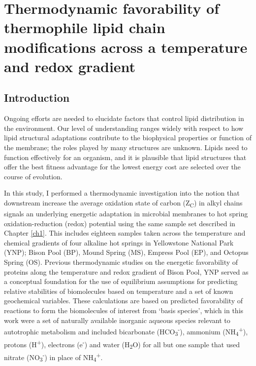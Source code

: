 \chapter[THERMODYNAMIC FAVORABILITY OF THERMOPHILE LIPID CHAIN MODIFICATIONS ACROSS A TEMPERATURE AND REDOX GRADIENT]{Thermodynamic favorability of thermophile lipid chain modifications across a temperature and redox gradient}\label{ch2}

\section{Introduction}

Ongoing efforts are needed to elucidate factors that control lipid distribution in the environment. Our level of understanding ranges widely with respect to how lipid structural adaptations contribute to the biophysical properties or function of the membrane; the roles played by many structures are unknown. Lipids need to function effectively for an organism, and it is plausible that lipid structures that offer the best fitness advantage for the lowest energy cost are selected over the course of evolution. 

In this study, I performed a thermodynamic investigation into the notion that downstream increase the average oxidation state of carbon (Z\textsubscript{C}) in alkyl chains signals an underlying energetic adaptation in microbial membranes to hot spring oxidation-reduction (redox) potential using the same sample set described in Chapter \ref{ch1}. This includes eighteen samples taken across the temperature and chemical gradients of four alkaline hot springs in Yellowstone National Park (YNP); Bison Pool (BP), Mound Spring (MS), Empress Pool (EP), and Octopus Spring (OS). Previous thermodynamic studies on the energetic favorability of proteins along the temperature and redox gradient of Bison Pool, YNP \citep{dick2011calculation, dick2013metastable} served as a conceptual foundation for the use of equilibrium assumptions for predicting relative stabilities of biomolecules based on temperature and a set of known geochemical variables. These calculations are based on predicted favorability of reactions to form the biomolecules of interest from `basis species', which in this work were a set of naturally available inorganic aqueous species relevant to autotrophic metabolism and included bicarbonate (HCO\textsubscript{3}\textsuperscript{-}), ammonium (NH\textsubscript{4}\textsuperscript{+}), protons (H\textsuperscript{+}), electrons (e\textsuperscript{-}) and water (H\textsubscript{2}O) for all but one sample that used nitrate (NO\textsubscript{3}\textsuperscript{-}) in place of NH\textsubscript{4}\textsuperscript{+}.

